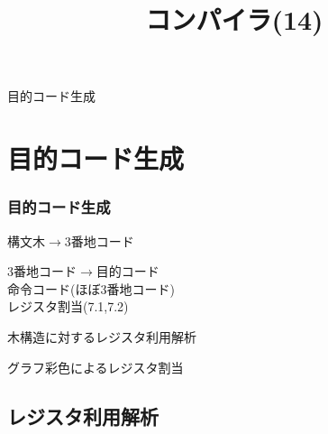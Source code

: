 \documentclass[ckj,dvipdfmx]{beamer}
\title{コンパイラ(14)}
\date{\lecturedate}
\begin{document}
\frame{\titlepage}

\begin{frame}
 \begin{center}
  {\Huge 目的コード生成}
 \end{center}
\end{frame}

\section{目的コード生成}

\begin{frame}
 \frametitle{目的コード生成}

 \begin{list}{}{}
  \item [フロントエンド] 構文木$\rightarrow$3番地コード
  \item [バックエンド] 3番地コード$\rightarrow$目的コード\\
	命令コード(ほぼ3番地コード)\\
	レジスタ割当(7.1,7.2)
	\begin{list}{}{}
	 \item [7.1] 木構造に対するレジスタ利用解析
	 \item [7.2] グラフ彩色によるレジスタ割当
	\end{list}
 \end{list}

\end{frame}

\subsection{レジスタ利用解析}
\end{document}
